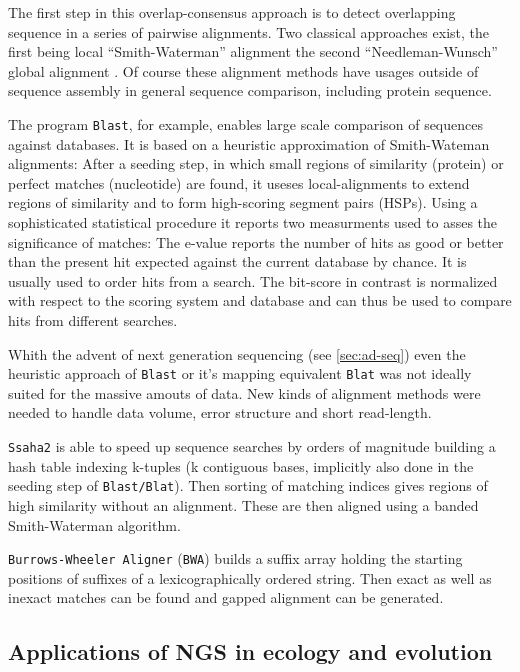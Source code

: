 The first step in this overlap-consensus approach is to detect
overlapping sequence in a series of pairwise alignments. Two classical
approaches exist, the first being local ``Smith-Waterman'' alignment
\cite{pmid7265238} the second ``Needleman-Wunsch'' global alignment
\cite{pmid7334527}. Of course these alignment methods have usages
outside of sequence assembly in general sequence comparison, including
protein sequence.

The program \texttt{Blast}, for example, enables large scale
comparison of sequences against databases. It is based on a heuristic
approximation of Smith-Wateman alignments: After a seeding step, in
which small regions of similarity (protein) or perfect matches
(nucleotide) are found, it useses local-alignments to extend regions
of similarity and to form high-scoring segment pairs (HSPs). Using a
sophisticated statistical procedure it reports two measurments used to
asses the significance of matches: The e-value reports the number of
hits as good or better than the present hit expected against the
current database by chance. It is usually used to order hits from a
search. The bit-score in contrast is normalized with respect to the
scoring system and database and can thus be used to compare hits from
different searches.

Whith the advent of next generation sequencing (see \ref{sec:ad-seq})
even the heuristic approach of \texttt{Blast} or it's mapping
equivalent \texttt{Blat} \cite{pmid11932250} was not ideally suited
for the massive amouts of data. New kinds of alignment methods were
needed to handle data volume, error structure and short read-length.

\texttt{Ssaha2} \cite{pmid11591649} is able to speed up sequence
searches by orders of magnitude building a hash table indexing
k-tuples (k contiguous bases, implicitly also done in the seeding step
of \texttt{Blast/Blat}). Then sorting of matching indices gives
regions of high similarity without an alignment. These are then
aligned using a banded Smith-Waterman algorithm.

\texttt{Burrows-Wheeler Aligner} (\texttt{BWA}) \cite{pmid20080505}
builds a suffix array holding the starting positions of suffixes of a
lexicographically ordered string. Then exact as well as inexact
matches can be found and gapped alignment can be generated.

\subsection{Applications of NGS in ecology and evolution}
\label{sec:appl-ngs}

